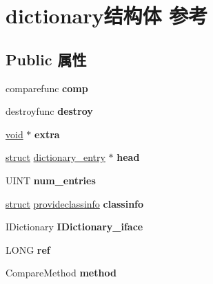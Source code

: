 \hypertarget{structdictionary}{}\section{dictionary结构体 参考}
\label{structdictionary}
\subsection*{Public 属性}
\begin{DoxyCompactItemize}
\item 
\mbox{\label{structdictionary_a0e0851c4be3e86f8d9cdf2e4bac3280b}} 
comparefunc {\bfseries comp}
\item 
\mbox{\label{structdictionary_aaaedc4085ba14e4cadb2988669bc8737}} 
destroyfunc {\bfseries destroy}
\item 
\mbox{\label{structdictionary_ad77b837a9b896345bfd43ac38d9f7b91}} 
\hyperlink{interfacevoid}{void} $\ast$ {\bfseries extra}
\item 
\mbox{\label{structdictionary_a77b43f7c632d779d9345c6baa63712b5}} 
\hyperlink{interfacestruct}{struct} \hyperlink{structdictionary__entry}{dictionary\+\_\+entry} $\ast$ {\bfseries head}
\item 
\mbox{\label{structdictionary_a6e2665bc5835b4067ff4b3af3a4fe117}} 
U\+I\+NT {\bfseries num\+\_\+entries}
\item 
\mbox{\label{structdictionary_a994fb5abc87dd58b4e0a858a4607e640}} 
\hyperlink{interfacestruct}{struct} \hyperlink{structprovideclassinfo}{provideclassinfo} {\bfseries classinfo}
\item 
\mbox{\label{structdictionary_ab76ac8f70fde19d8a9cc893697acd227}} 
I\+Dictionary {\bfseries I\+Dictionary\+\_\+iface}
\item 
\mbox{\label{structdictionary_a7284298779dd5c48b8642dc1273291b5}} 
L\+O\+NG {\bfseries ref}
\item 
\mbox{\label{structdictionary_ae49aca709e02b5f66881f185e1caa27d}} 
Compare\+Method {\bfseries method}

\end{DoxyCompactItemize}
